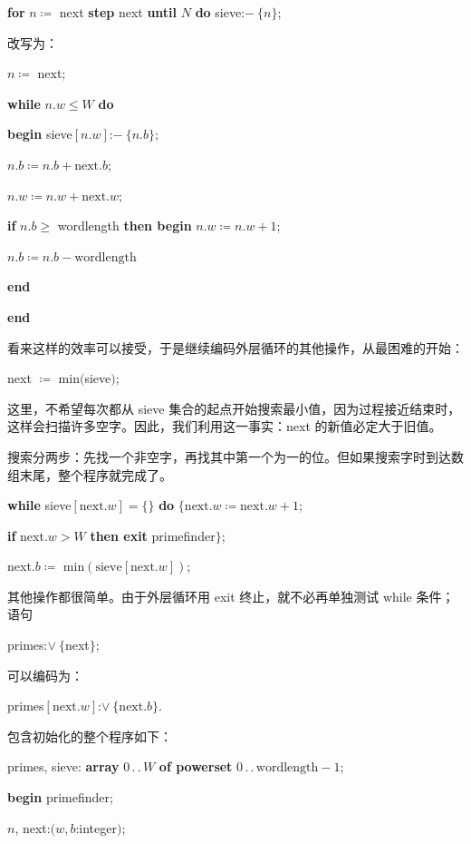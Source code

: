 \documentclass[twoside,11pt,fontset=none]{ctexbook}
\begin{document}
\quad \textbf{for} $n\coloneq$ next \textbf{step} next \textbf{until} $N$ \textbf{do} sieve:$-\ \{n\}$;

\noindent
改写为：

\quad $n\coloneq$ next;

\quad \textbf{while} $n.w \leqslant W$ \textbf{do}

\quad \quad \textbf{begin} sieve$[n.w]$:$-\ \{n.b\}$;

\quad \quad \quad $n.b\coloneq n.b + \text{next}.b$;

\quad \quad \quad $n.w\coloneq n.w + \text{next}.w;$

\quad \quad \quad \textbf{if} $n.b \geqslant$ wordlength \textbf{then begin} $n.w \coloneq n.w + 1$;

\quad \quad \quad \quad $n.b \coloneq n.b - \text{wordlength}$

\quad \quad \quad \textbf{end}

\quad \quad \textbf{end}

\noindent
看来这样的效率可以接受，于是继续编码外层循环的其他操作，从最困难的开始：

\quad next $\coloneq$ min$($sieve$)$;

\noindent
这里，不希望每次都从 sieve 集合的起点开始搜索最小值，因为过程接近结束时，这样会扫描许多空字。因此，我们利用这一事实：next 的新值必定大于旧值。

搜索分两步：先找一个非空字，再找其中第一个为一的位。但如果搜索字时到达数组末尾，整个程序就完成了。

\quad \textbf{while} sieve$[\text{next}.w] = \{\}$ \textbf{do} $\{\text{next}.w \coloneq \text{next}.w +1$;

\quad \quad \textbf{if} next.$w > W$ \textbf{then exit} primefinder$\}$;

\quad \quad next.$b\coloneq$ min$(\text{sieve}[\text{next}.w])$;

其他操作都很简单。由于外层循环用 exit 终止，就不必再单独测试 while 条件；语句

\quad primes:$\vee\ \{$next$\}$;

\noindent
可以编码为：

\quad primes$[\text{next}.w]$:$\vee\ \{\text{next}.b\}$.

包含初始化的整个程序如下：

\quad primes, sieve: \textbf{array} $0\,.\,.\,W$ \textbf{of powerset} $0\,.\,.\,\text{wordlength} - 1$;

\quad \textbf{begin} primefinder;

\quad \quad $n$, next:$(w, b$:integer$)$;
\end{document}
